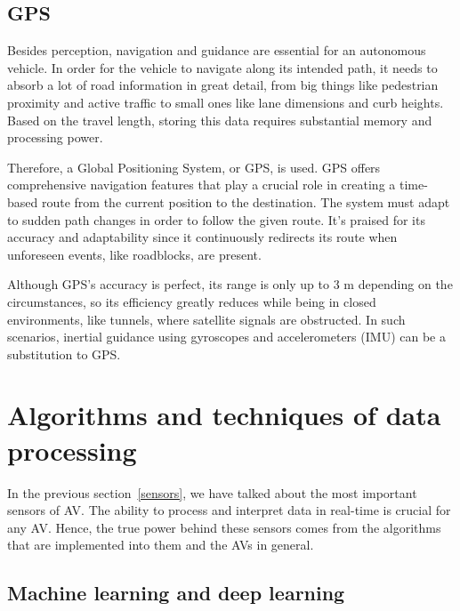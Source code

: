 \documentclass[10pt,oneside,english,a4paper]{article}
\begin{document}
\subsection{GPS}
\indent Besides perception, navigation and guidance are essential for an autonomous vehicle. In order for the vehicle to navigate along its intended path, it needs to absorb a lot of road information in great detail, from big things like pedestrian proximity and active traffic to small ones like lane dimensions and curb heights. Based on the travel length, storing this data requires substantial memory and processing power.
\par Therefore, a Global Positioning System, or GPS, is used. GPS offers comprehensive navigation features that play a crucial role in creating a time-based route from the current position to the destination. The system must adapt to sudden path changes in order to follow the given route. It's praised for its accuracy and adaptability since it continuously redirects its route when unforeseen events, like roadblocks, are present. 
\par Although GPS's accuracy is perfect, its range is only up to 3 m depending on the circumstances, so its efficiency greatly reduces while being in closed environments, like tunnels, where satellite signals are obstructed. In such scenarios, inertial guidance using gyroscopes and accelerometers (IMU) can be a substitution to GPS.
\cite{researchresults}\cite{Sensorfusion}\cite{stateoftheart}


\section{Algorithms and techniques of data processing} \label{algorithms}

In the previous section~\eqref{sensors}, we have talked about the most important sensors of AV. The ability to process and interpret data in real-time is crucial for any AV. Hence, the true power behind these sensors comes from the algorithms that are implemented into them and the AVs in general.  

\subsection{Machine learning and deep learning}
\indent 

\end{document}
